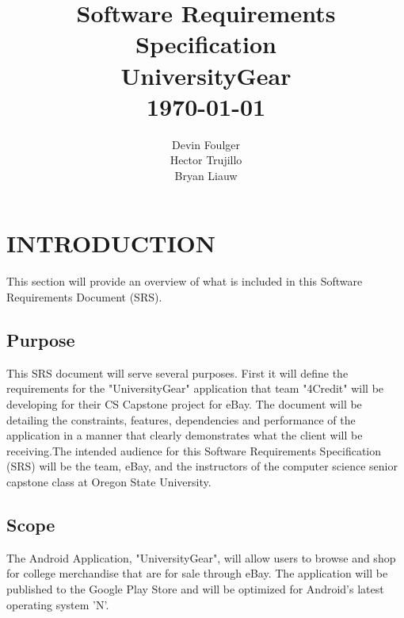 \documentclass[journal,compsoc, 10pt, draftclsnofoot, onecolumn]{IEEEtran}
\begin{document}
\title{\vspace{20em}Software Requirements Specification \\{\vspace{-1ex}\huge UniversityGear} \\ {\large \today}}
\author{\vspace{10ex}Devin Foulger \\{\vspace{-1ex}Hector Trujillo} \\{\vspace{-1ex}Bryan Liauw}}

\begin{titlepage}

\maketitle
\thispagestyle{empty}

\end{titlepage}

\tableofcontents

\section{INTRODUCTION}

This section will provide an overview of what is included in this Software 
Requirements Document (SRS).

\subsection{Purpose}

This SRS document will serve several purposes. First it will define the 
requirements for the "UniversityGear" application that team "4Credit"
 will be developing for their CS Capstone project for eBay. The 
document will be detailing the constraints, features, dependencies and performance 
of the application in a manner that clearly demonstrates what the client will be
 receiving.The intended audience for this Software Requirements Specification 
(SRS) will be the team, eBay, and the instructors of the computer science senior
 capstone class at Oregon State University. 

\subsection{Scope}

The Android Application, "UniversityGear", will allow users to browse and 
shop for college merchandise that are for sale through eBay. The application 
will be published to the Google Play Store and will be optimized for Android's 
latest operating system 'N'. \newline
\end{document}
